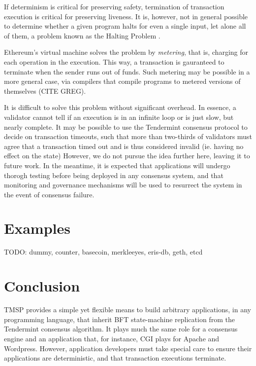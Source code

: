 If determinism is critical for preserving safety, termination of transaction execution is critical for preserving liveness.
It is, however, not in general possible to determine whether a given program halts for even a single input, let alone all of them,
a problem known as the Halting Problem \cite{halting}.

Ethereum's virtual machine solves the problem by \emph{metering}, that is, charging for each operation in the execution.
This way, a transaction is gauranteed to terminate when the sender runs out of funds.
Such metering may be possible in a more general case, 
via compilers that compile programs to metered versions of themselves \cite{} (CITE GREG).

It is difficult to solve this problem without significant overhead.
In essence, a validator cannot tell if an execution is in an infinite loop or is just slow, but nearly complete.
It may be possible to use the Tendermint consensus protocol to decide on transaction timeouts, 
such that more than two-thirds of validators must agree that a transaction timed out and is thus considered invalid (ie. having no effect on the state)
However, we do not pursue the idea further here, leaving it to future work. 
In the meantime, it is expected that applications will undergo thorogh testing before being deployed in any consensus system,
and that monitoring and governance mechanisms will be used to resurrect the system in the event of consensus failure.

\section{Examples}

TODO: dummy, counter, basecoin, merkleeyes, eris-db, geth, etcd

\section{Conclusion}

TMSP provides a simple yet flexible means to build arbitrary applications,
in any programming language,
that inherit BFT state-machine replication from the Tendermint consensus algorithm.
It plays much the same role for a consensus engine and an application that, for instance, CGI plays for Apache and Wordpress.
However, application developers must take special care to ensure their applications are deterministic, and that transaction executions terminate.

